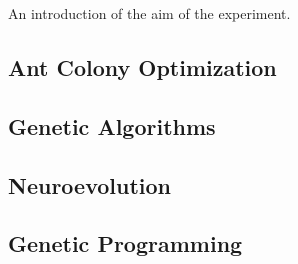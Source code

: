An introduction of the aim of the experiment.

\subsection{Ant Colony Optimization}

\subsection{Genetic Algorithms}

\subsection{Neuroevolution}

\subsection{Genetic Programming}



